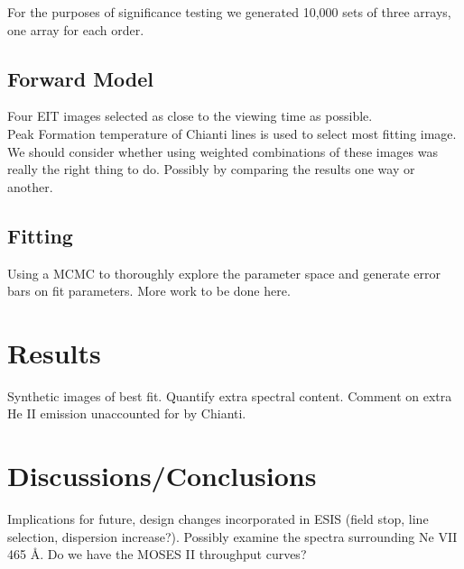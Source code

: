 \documentclass[]{solarphysics}
\begin{document}
\begin{article}
	
	
	For the purposes of significance testing we generated 10,000 sets of three arrays, one array for each order.
	
	
	
	
	
	\subsection{Forward Model} 
	Four EIT images selected as close to the viewing time as possible.  \\
	Peak Formation temperature of Chianti lines is used to select most fitting image.  We should consider whether using weighted combinations of these images was really the right thing to do. Possibly by comparing the results one way or another.
	\subsection{Fitting}
	Using a MCMC to thoroughly explore the parameter space and generate error bars on fit parameters. More work to be done here.

\section{Results}
	Synthetic images of best fit.  Quantify extra spectral content.  Comment on extra He II emission unaccounted for by Chianti. 

\section{Discussions/Conclusions}
	Implications for future, design changes incorporated in ESIS (field stop, line selection, dispersion increase?). Possibly examine the spectra surrounding Ne VII 465 \AA.  Do we have the MOSES II throughput curves? 
	



\end{article}
\end{document}
